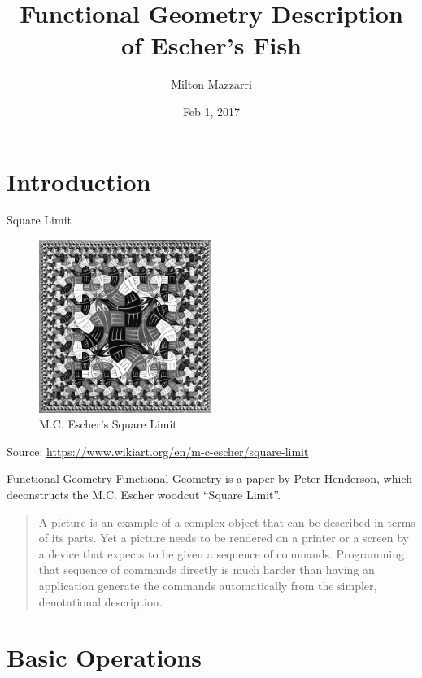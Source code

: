 \documentclass{beamer}
\title{Functional Geometry Description of Escher's Fish}
\date{Feb 1, 2017}
\author{Milton Mazzarri}
\institute{Houston Elixir Meetup}
\begin{document}
    \maketitle

    \section{Introduction}

    \begin{frame}{Square Limit}

        \begin{figure}
           \centering
            \includegraphics[width=0.5\textwidth]{./figs/square-limit}
            \caption{M.C. Escher's Square Limit}
            \label{fig:square_limit}
        \end{figure}
        {\footnotesize Source: \url{https://www.wikiart.org/en/m-c-escher/square-limit}}
    \end{frame}

    \begin{frame}{Functional Geometry}
        Functional Geometry is a paper by Peter Henderson\cite{Henderson82,Henderson02}, which deconstructs the M.C. Escher woodcut ``Square Limit''.
        \begin{quote}
            A picture is an example of a complex object that can be described
            in terms of its parts. Yet a picture needs to be rendered on a
            printer or a screen by a device that expects to be given a sequence
            of commands. Programming that sequence of commands directly is much
            harder than having an application generate the commands
            automatically from the simpler, denotational description.
        \end{quote}
    \end{frame}

    \section{Basic Operations}
\end{document}
